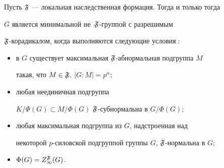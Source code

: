 \begin{thm}


Пусть $\frak F$ --- локальная наследственная формация. Тогда и только тогда


$G$ является минимальной не~$\frak F$-группой с разрешимым


$\frak F$-корадикалом, когда выполняются следующие условия\,{\em :}


\begin{itemize}


\item[1)] в $G$ существует максимальная $\frak F$-абнормальная подгруппа $M$


такая, что $M\in\frak F,$ $|G{:}M|=p^\alpha;$


\item[2)] любая неединичная подгруппа


$K/\Phi(G)\subset M/\Phi(G)$\; $\frak F$-субнормальна в $G/\Phi(G);$


\item[3)] любая максимальная подгруппа из $G$, надстроенная над


некоторой $p$-силовской подгруппой группы $G$, $\frak F$-нормальна в $G;$


\item[4)] $\Phi(G)=Z^{\frak F}_\infty(G)$.


\end{itemize}


\end{thm}





